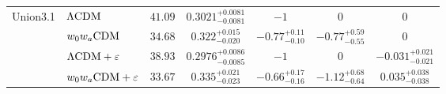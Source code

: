 \begin{table}[t]
\begin{ruledtabular}
\begin{tabular}{llrcccc}
\hline\rule{0pt}{1.4em}%
Union3.1 & $\Lambda{\rm CDM}$ & $41.09$ & $0.3021^{+0.0081}_{-0.0081}$ & $-1$ & $0$ & $0$ \\[0.4em]
 & $w_0w_a{\rm CDM}$ & $34.68$ & $0.322^{+0.015}_{-0.020}$ & $-0.77^{+0.11}_{-0.10}$ & $-0.77^{+0.59}_{-0.55}$ & $0$ \\[0.4em]
 & $\Lambda{\rm CDM} + \varepsilon$ & $38.93$ & $0.2976^{+0.0086}_{-0.0085}$ & $-1$ & $0$ & $-0.031^{+0.021}_{-0.021}$ \\[0.4em]
 & $w_0w_a{\rm CDM} + \varepsilon$ & $33.67$ & $0.335^{+0.021}_{-0.023}$ & $-0.66^{+0.17}_{-0.16}$ & $-1.12^{+0.68}_{-0.64}$ & $0.035^{+0.038}_{-0.038}$ \\[0.4em]
\end{tabular}
\end{ruledtabular}
\end{table}
